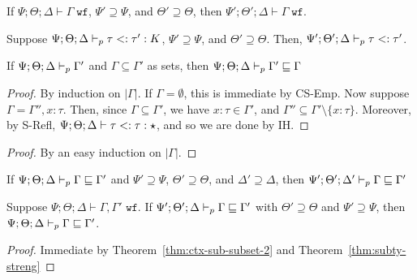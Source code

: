 \begin{theorem}
If $\Psi ; \Theta ; \Delta \vdash \Gamma \; \texttt{wf}$, $\Psi' \supseteq \Psi$, and $\Theta' \supseteq \Theta$, then
$\Psi' ; \Theta' ; \Delta \vdash \Gamma \; \texttt{wf}$.
\end{theorem}

\typeidxsubst*


\begin{theorem}
Suppose $\Psi ; \Theta ; \Delta \vdash_p \tau <: \tau' : K$, $\Psi' \supseteq \Psi$, and $\Theta' \supseteq \Theta$.
Then, $\Psi' ; \Theta' ; \Delta \vdash_p \tau <: \tau'$.
\end{theorem}

\subtystreng*


\begin{theorem}
If $\Psi ; \Theta ; \Delta \vdash_p \Gamma'$ and $\Gamma \subseteq \Gamma'$ as sets, then $\Psi ; \Theta ; \Delta \vdash_p \Gamma' \sqsubseteq \Gamma$
\label{thm:ctx-sub-subset1}
\end{theorem}
\begin{proof}
By induction on $|\Gamma|$.
If $\Gamma = \emptyset$, this is immediate by CS-Emp.
Now suppose $\Gamma = \Gamma'', x : \tau$. Then, since $\Gamma \subseteq \Gamma'$, we have $x : \tau \in \Gamma'$, and $\Gamma'' \subseteq \Gamma' \setminus \{x : \tau\}$. Moreover, by S-Refl, $\Psi ; \Theta ; \Delta \vdash \tau <: \tau : \star$, and so we are done by IH.
\end{proof}

\ctxsubsubset*
\begin{proof}
By an easy induction on $|\Gamma|$.
\end{proof}

\begin{theorem}
If $\Psi ; \Theta ; \Delta \vdash_p \Gamma \sqsubseteq \Gamma'$ and $\Psi' \supseteq \Psi$, $\Theta' \supseteq \Theta$, and $\Delta' \supseteq \Delta$, then
$\Psi' ; \Theta' ; \Delta' \vdash_p \Gamma \sqsubseteq \Gamma'$
\label{thm:ctx-sub-wkn}
\end{theorem}

\begin{theorem}
Suppose $\Psi ; \Theta ; \Delta \vdash \Gamma,\Gamma' \texttt{ wf}$.
If $\Psi' ; \Theta' ; \Delta \vdash_p \Gamma \sqsubseteq \Gamma'$ with $\Theta' \supseteq \Theta$ and $\Psi' \supseteq \Psi$, then $\Psi ; \Theta ; \Delta \vdash_p \Gamma \sqsubseteq \Gamma'$.
\end{theorem}
\label{thm:ctx-sub-streng}
\begin{proof}
Immediate by Theorem~\ref{thm:ctx-sub-subset-2} and Theorem~\ref{thm:subty-streng}
\end{proof}

